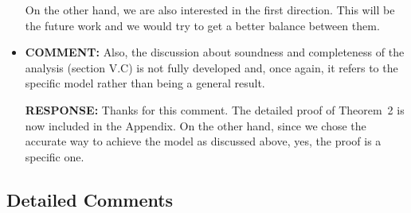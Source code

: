 \documentclass[10pt,journal]{IEEEtran}
\newcommand{\ANSWER}{{\bf RESPONSE: }}
\newcommand{\COMMENT}{{\bf COMMENT: }}
\begin{document}
\begin{itemize}
On the other hand, we are also interested in the first direction. This
will be the future work and we would try to get a better balance
between them.

\item
\COMMENT Also, the discussion about soundness and completeness of the
analysis (section V.C) is not fully developed and, once again, it
refers to the specific model rather than being a general result.

\ANSWER Thanks for this comment. The detailed proof of Theorem~2 is
now included in the Appendix. On the other hand, since we chose the
accurate way to achieve the model as discussed above, yes, the proof
is a specific one.

\end{itemize}

\subsection{Detailed Comments}
\end{document}
